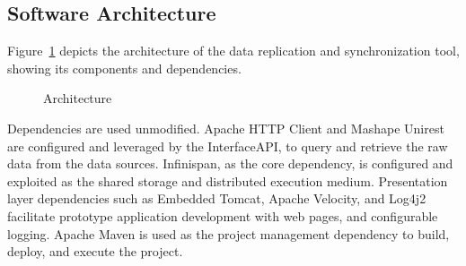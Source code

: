 \documentclass[conference]{IEEEtran}
\begin{document}
\subsection{Software Architecture}
Figure~\ref{fig:arch} depicts the architecture of the data replication and synchronization tool, showing its components and dependencies.
\begin{figure}[!htbp]
\begin{center}
\end{center}
  \vspace{-18pt}
  
 \caption{Architecture}
 \label{fig:arch}
 \vspace{-13pt}
 
\end{figure}

Dependencies are used unmodified. Apache HTTP Client and Mashape Unirest are configured and leveraged by the InterfaceAPI, to query and retrieve the raw data from the data sources. Infinispan, as the core dependency, is configured and exploited as the shared storage and distributed execution medium. Presentation layer dependencies such as Embedded Tomcat, Apache Velocity, and Log4j2 facilitate prototype application development with web pages, and configurable logging. Apache Maven is used as the project management dependency to build, deploy, and execute the project.
\end{document}
